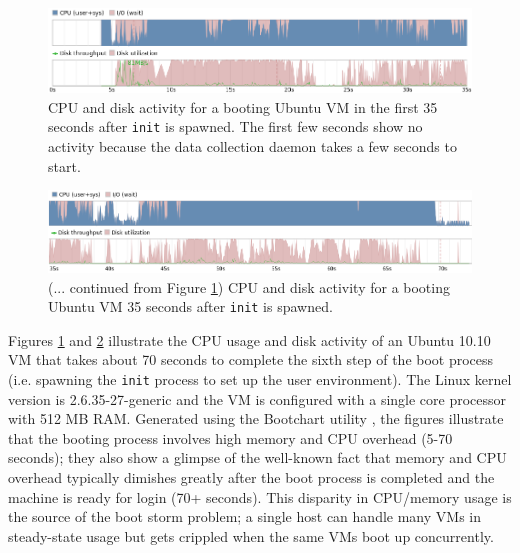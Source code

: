 \begin{figure}[h]
  \centering
  \includegraphics[scale=0.64, trim=1cm 0cm 1cm 0cm]{boot_first35seconds.png}
  \caption[CPU and disk activity for a booting Ubuntu VM in the first 35
  seconds after \texttt{init} is spawned]%
  {CPU and disk activity for a booting Ubuntu VM in the first 35 seconds after \texttt{init} is spawned.
  The first few seconds show no activity because
  the data collection daemon takes a few seconds to start.}
  \label{boot:first35}
\end{figure}

\begin{figure}[h]
  \center
  \includegraphics[scale=0.6, trim=1cm 0cm 1cm 0cm]{boot_last35seconds.png}
  \caption[(... continued) CPU and disk activity for a booting VM
  35 seconds after \texttt{init} is spawned. ]%
  {(... continued from Figure \ref{boot:first35}) CPU and disk activity for a booting Ubuntu VM 35 seconds after \texttt{init} is spawned.}
  \label{boot:last35}
\end{figure}

Figures \ref{boot:first35} and \ref{boot:last35}
illustrate the CPU usage and disk activity 
of an Ubuntu 10.10 VM that takes about 70 seconds
to complete the sixth step of the boot process (i.e. spawning 
the \texttt{init} process to set up the user environment).
The Linux kernel version is 2.6.35-27-generic
and the VM is configured with a single core processor
with 512 MB RAM. Generated using
the Bootchart utility \cite{mahkovec2005bootchart},
the figures illustrate that
the booting process involves high memory
and CPU overhead (5-70 seconds); they also 
show a glimpse of the well-known fact that memory and CPU
overhead typically dimishes greatly after the boot
process is completed and the machine is
ready for login (70+ seconds). This disparity
in CPU/memory usage is the source of the boot storm problem;
a single host can handle many VMs in
steady-state usage but gets crippled
when the same VMs boot up concurrently.

